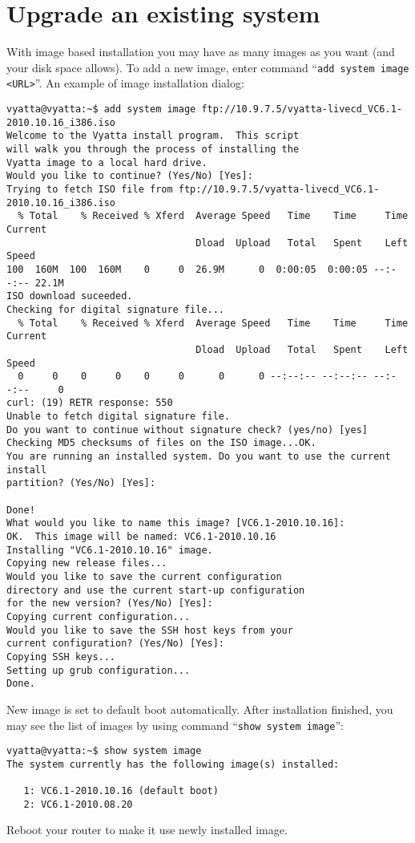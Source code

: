 \section{Upgrade an existing system}
With image based installation you may have as many images as you want (and your disk space allows). To add a new
image, enter command ``\texttt{add system image <URL>}''. An example of image installation dialog:
\begin{verbatim}
vyatta@vyatta:~$ add system image ftp://10.9.7.5/vyatta-livecd_VC6.1-2010.10.16_i386.iso
Welcome to the Vyatta install program.  This script
will walk you through the process of installing the
Vyatta image to a local hard drive.
Would you like to continue? (Yes/No) [Yes]: 
Trying to fetch ISO file from ftp://10.9.7.5/vyatta-livecd_VC6.1-2010.10.16_i386.iso
  % Total    % Received % Xferd  Average Speed   Time    Time     Time  Current
                                 Dload  Upload   Total   Spent    Left  Speed
100  160M  100  160M    0     0  26.9M      0  0:00:05  0:00:05 --:--:-- 22.1M
ISO download suceeded.
Checking for digital signature file...
  % Total    % Received % Xferd  Average Speed   Time    Time     Time  Current
                                 Dload  Upload   Total   Spent    Left  Speed
  0     0    0     0    0     0      0      0 --:--:-- --:--:-- --:--:--     0
curl: (19) RETR response: 550
Unable to fetch digital signature file.
Do you want to continue without signature check? (yes/no) [yes] 
Checking MD5 checksums of files on the ISO image...OK.
You are running an installed system. Do you want to use the current install
partition? (Yes/No) [Yes]: 

Done!
What would you like to name this image? [VC6.1-2010.10.16]: 
OK.  This image will be named: VC6.1-2010.10.16
Installing "VC6.1-2010.10.16" image.
Copying new release files...
Would you like to save the current configuration 
directory and use the current start-up configuration 
for the new version? (Yes/No) [Yes]: 
Copying current configuration...
Would you like to save the SSH host keys from your 
current configuration? (Yes/No) [Yes]: 
Copying SSH keys...
Setting up grub configuration...
Done.
\end{verbatim}
New image is set to default boot automatically. After installation finished, you may see the list of images
by using command ``\texttt{show system image}'':
\begin{verbatim}
vyatta@vyatta:~$ show system image 
The system currently has the following image(s) installed:

   1: VC6.1-2010.10.16 (default boot)
   2: VC6.1-2010.08.20
\end{verbatim}
Reboot your router to make it use newly installed image.


